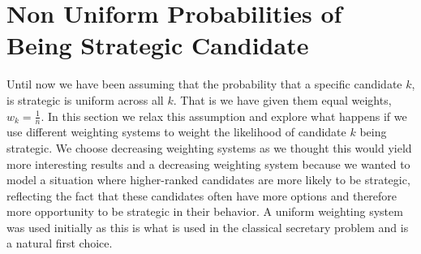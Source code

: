 \documentclass{article}
\begin{document}



\section{Non Uniform Probabilities of Being Strategic Candidate}

Until now we have been assuming that the probability that a specific candidate $k$, is strategic is uniform across all $k$. That is we have given them equal weights, $w_k = \frac{1}{n}$. In this section we relax this assumption and explore what happens if we use different weighting systems to weight the likelihood of candidate $k$ being strategic. We choose decreasing weighting systems as we thought this would yield more interesting results and a decreasing weighting system because we wanted to model a situation where higher-ranked candidates are more likely to be strategic, reflecting the fact that these candidates often have more options and therefore more opportunity to be strategic in their behavior. A uniform weighting system was used initially as this is what is used in the classical secretary problem and is a natural first choice.
\end{document}

